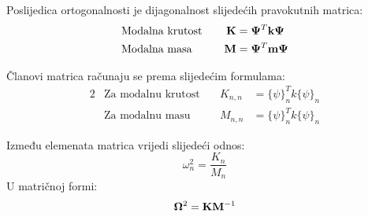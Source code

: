 Poslijedica ortogonalnosti je dijagonalnost slijedećih pravokutnih matrica:
\begin{alignat}{2}
    &\text{Modalna krutost}\quad & \mathbf{K}&=\mathbf{\Psi}^T\mathbf{k}\mathbf{\Psi}\label{eq:modalna_krutost_matrica}\\
    &\text{Modalna masa}\quad &\mathbf{M}&=\mathbf{\Psi}^T\mathbf{m}\mathbf{\Psi}\label{eq:modalna_masa_matrica}
\end{alignat}

Članovi matrica računaju se prema slijedećim formulama:
\begin{alignat}{2}
    &\text{Za modalnu krutost}\quad & K_{n,n}&=\{\psi\}_n^Tk\{\psi\}_n\label{eq:modalna_krutost}\\
    &\text{Za modalnu masu}\quad &M_{n,n}&=\{\psi\}_n^Tk\{\psi\}_n\label{eq:modalna_masa}
\end{alignat}

Između elemenata matrica vrijedi slijedeći odnos:
\begin{equation}
    \omega_n^2=\frac{K_n}{M_n}
\end{equation}
U matričnoj formi:
\begin{equation}
    \mathbf{\Omega}^2=\mathbf{K}\mathbf{M}^{-1}
\end{equation}

